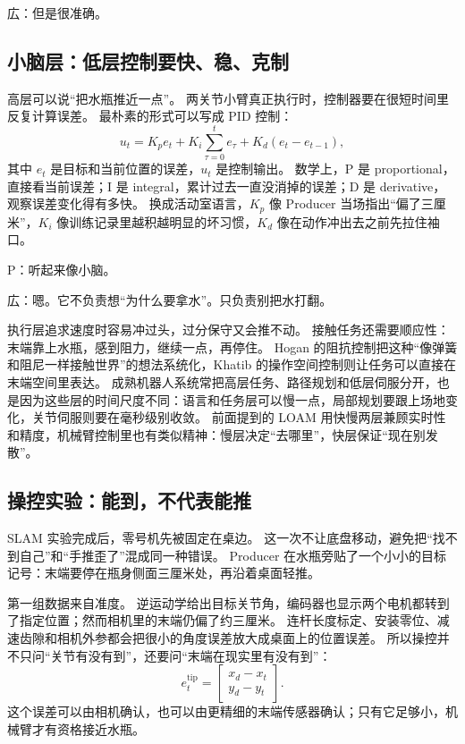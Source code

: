 広：但是很准确。

\subsection{小脑层：低层控制要快、稳、克制}

高层可以说“把水瓶推近一点”。
两关节小臂真正执行时，控制器要在很短时间里反复计算误差。
最朴素的形式可以写成 PID 控制：
\begin{equation}
u_t = K_p e_t + K_i \sum_{\tau=0}^{t} e_\tau + K_d(e_t-e_{t-1}),
\end{equation}
其中 $e_t$ 是目标和当前位置的误差，$u_t$ 是控制输出。
数学上，P 是 proportional，直接看当前误差；I 是 integral，累计过去一直没消掉的误差；D 是 derivative，观察误差变化得有多快\cite{astrom1995pid}。
换成活动室语言，$K_p$ 像 Producer 当场指出“偏了三厘米”，$K_i$ 像训练记录里越积越明显的坏习惯，$K_d$ 像在动作冲出去之前先拉住袖口。

P：听起来像小脑。

広：嗯。它不负责想“为什么要拿水”。只负责别把水打翻。

执行层追求速度时容易冲过头，过分保守又会推不动。
接触任务还需要顺应性：末端靠上水瓶，感到阻力，继续一点，再停住。
Hogan 的阻抗控制把这种“像弹簧和阻尼一样接触世界”的想法系统化\cite{hogan1985impedance}，Khatib 的操作空间控制则让任务可以直接在末端空间里表达\cite{khatib1987operational}。
成熟机器人系统常把高层任务、路径规划和低层伺服分开，也是因为这些层的时间尺度不同：语言和任务层可以慢一点，局部规划要跟上场地变化，关节伺服则要在毫秒级别收敛。
前面提到的 LOAM 用快慢两层兼顾实时性和精度，机械臂控制里也有类似精神：慢层决定“去哪里”，快层保证“现在别发散”。

\subsection{操控实验：能到，不代表能推}

SLAM 实验完成后，零号机先被固定在桌边。
这一次不让底盘移动，避免把“找不到自己”和“手推歪了”混成同一种错误。
Producer 在水瓶旁贴了一个小小的目标记号：末端要停在瓶身侧面三厘米处，再沿着桌面轻推。

第一组数据来自准度。
逆运动学给出目标关节角，编码器也显示两个电机都转到了指定位置；然而相机里的末端仍偏了约三厘米。
连杆长度标定、安装零位、减速齿隙和相机外参都会把很小的角度误差放大成桌面上的位置误差。
所以操控并不只问“关节有没有到”，还要问“末端在现实里有没有到”：
\begin{equation}
e_t^{\mathrm{tip}}=
\left[
\begin{array}{c}
x_d-x_t\\
y_d-y_t
\end{array}
\right].
\end{equation}
这个误差可以由相机确认，也可以由更精细的末端传感器确认；只有它足够小，机械臂才有资格接近水瓶。

